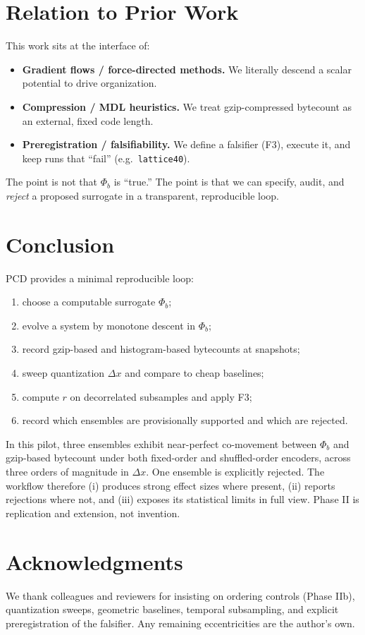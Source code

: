 \documentclass[11pt,a4paper]{article}
\newcommand{\phib}{\Phi_b}
\begin{document}
\section{Relation to Prior Work}
This work sits at the interface of:
\begin{itemize}
\item \textbf{Gradient flows / force-directed methods.} We literally descend a scalar potential to drive organization.
\item \textbf{Compression / MDL heuristics.} We treat gzip-compressed bytecount as an external, fixed code length.
\item \textbf{Preregistration / falsifiability.} We define a falsifier (F3), execute it, and keep runs that ``fail'' (e.g.\ \texttt{lattice40}).
\end{itemize}
The point is not that $\phib$ is ``true.'' The point is that we can specify, audit, and \emph{reject} a proposed surrogate in a transparent, reproducible loop.

\section{Conclusion}
PCD provides a minimal reproducible loop:
\begin{enumerate}
\item choose a computable surrogate $\phib$;
\item evolve a system by monotone descent in $\phib$;
\item record gzip-based and histogram-based bytecounts at snapshots;
\item sweep quantization $\Delta x$ and compare to cheap baselines;
\item compute $r$ on decorrelated subsamples and apply F3;
\item record which ensembles are provisionally supported and which are rejected.
\end{enumerate}

In this pilot, three ensembles exhibit near-perfect co-movement between $\phib$ and gzip-based bytecount under both fixed-order and shuffled-order encoders, across three orders of magnitude in $\Delta x$. One ensemble is explicitly rejected. The workflow therefore (i) produces strong effect sizes where present, (ii) reports rejections where not, and (iii) exposes its statistical limits in full view. Phase II is replication and extension, not invention.

\section*{Acknowledgments}
We thank colleagues and reviewers for insisting on ordering controls (Phase IIb), quantization sweeps, geometric baselines, temporal subsampling, and explicit preregistration of the falsifier. Any remaining eccentricities are the author's own.
\end{document}
